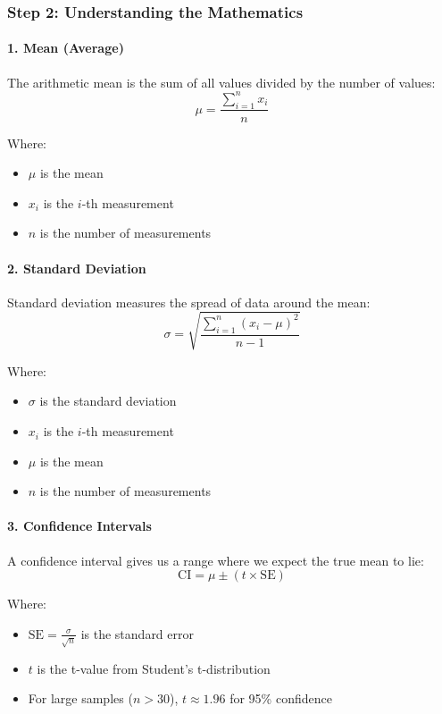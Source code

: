\documentclass[12pt,a4paper]{article}
\begin{document}
\subsubsection{Step 2: Understanding the Mathematics}

\paragraph{1. Mean (Average)}
The arithmetic mean is the sum of all values divided by the number of values:
\[ \mu = \frac{\sum_{i=1}^{n} x_i}{n} \]

Where:
\begin{itemize}
    \item $\mu$ is the mean
    \item $x_i$ is the $i$-th measurement
    \item $n$ is the number of measurements
\end{itemize}

\paragraph{2. Standard Deviation}
Standard deviation measures the spread of data around the mean:
\[ \sigma = \sqrt{\frac{\sum_{i=1}^{n} (x_i - \mu)^2}{n-1}} \]

Where:
\begin{itemize}
    \item $\sigma$ is the standard deviation
    \item $x_i$ is the $i$-th measurement
    \item $\mu$ is the mean
    \item $n$ is the number of measurements
\end{itemize}

\paragraph{3. Confidence Intervals}
A confidence interval gives us a range where we expect the true mean to lie:
\[ \text{CI} = \mu \pm (t \times \text{SE}) \]

Where:
\begin{itemize}
    \item $\text{SE} = \frac{\sigma}{\sqrt{n}}$ is the standard error
    \item $t$ is the t-value from Student's t-distribution
    \item For large samples ($n > 30$), $t \approx 1.96$ for 95\% confidence
\end{itemize}
\end{document}
